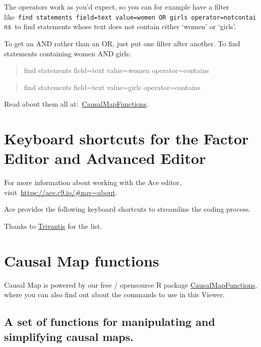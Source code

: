 \documentclass[
]{book}
\begin{document}
The operators work as you'd expect, so you can for example have a filter like~\texttt{find\ statements\ field=text\ value=women\ OR\ girls\ operator=notcontains}~to find statements whose text does not contain either `women' or `girls'.

To get an AND rather than an OR, just put one filter after another. To find statements containing women AND girls:

\begin{quote}
find statements field=text value=women operator=contains
\end{quote}

\begin{quote}
find statements field=text value=girls operator=contains
\end{quote}

Read about them all at:~\href{https://stevepowell99.github.io/CausalMapFunctions/reference/index.html}{CausalMapFunctions}.

\hypertarget{keyboard-shortcuts-for-the-factor-editor-and-advanced-editor}{%
\chapter{Keyboard shortcuts for the Factor Editor and Advanced Editor}\label{keyboard-shortcuts-for-the-factor-editor-and-advanced-editor}}

For more information about working with the Ace editor, visit~\url{https://ace.c9.io/\#nav=about}.

Ace provides the following keyboard shortcuts to streamline the coding process.

Thanks to \href{https://www.trivantis.com/help/Lectora_Online/4.8/en/HelpHTMLs/Content/16.html}{Trivantis} for the list.

\hypertarget{causal-map-functions}{%
\chapter{Causal Map functions}\label{causal-map-functions}}

Causal Map is powered by our free / opensource R package \href{https://stevepowell99.github.io/CausalMapFunctions/}{CausalMapFunctions}, where you can also find out about the commands to use in this Viewer.

\hypertarget{a-set-of-functions-for-manipulating-and-simplifying-causal-maps.}{%
\section{A set of functions for manipulating and simplifying causal maps.}\label{a-set-of-functions-for-manipulating-and-simplifying-causal-maps.}}
\end{document}
